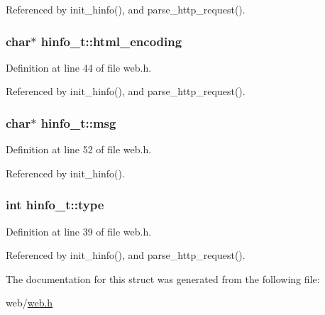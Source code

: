 Referenced by init\+\_\+hinfo(), and parse\+\_\+http\+\_\+request().

\subsubsection[{\texorpdfstring{html\+\_\+encoding}{html_encoding}}]{\setlength{\rightskip}{0pt plus 5cm}char$\ast$ hinfo\+\_\+t\+::html\+\_\+encoding}\hypertarget{structhinfo__t_ac03bcdde52e49a14bf9112f295f216b5}{}\label{structhinfo__t_ac03bcdde52e49a14bf9112f295f216b5}


Definition at line 44 of file web.\+h.



Referenced by init\+\_\+hinfo(), and parse\+\_\+http\+\_\+request().

\subsubsection[{\texorpdfstring{msg}{msg}}]{\setlength{\rightskip}{0pt plus 5cm}char$\ast$ hinfo\+\_\+t\+::msg}\hypertarget{structhinfo__t_a06469570091ad74724457998e07d5b56}{}\label{structhinfo__t_a06469570091ad74724457998e07d5b56}


Definition at line 52 of file web.\+h.



Referenced by init\+\_\+hinfo().

\subsubsection[{\texorpdfstring{type}{type}}]{\setlength{\rightskip}{0pt plus 5cm}int hinfo\+\_\+t\+::type}\hypertarget{structhinfo__t_a4e896141431943909a71282fc56799fb}{}\label{structhinfo__t_a4e896141431943909a71282fc56799fb}


Definition at line 39 of file web.\+h.



Referenced by init\+\_\+hinfo(), and parse\+\_\+http\+\_\+request().



The documentation for this struct was generated from the following file\+:\begin{DoxyCompactItemize}
\item 
web/\hyperlink{web_8h}{web.\+h}\end{DoxyCompactItemize}
